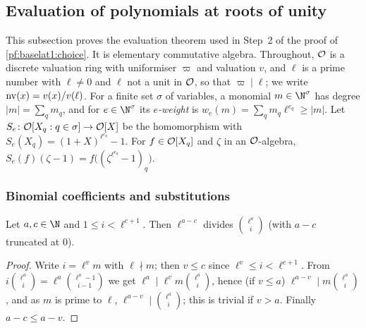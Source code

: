 \subsection{Evaluation of polynomials at roots of unity}\label{pf:baselat1:ssec:roots}

This subsection proves the evaluation theorem used in Step~2 of the proof of \cref{pf:baselat1:choice}. It is
elementary commutative algebra. Throughout, $\mathcal O$ is a discrete valuation ring with uniformiser $\varpi$
and valuation $v$, and $\ell$ is a prime number with $\ell\ne0$ and $\ell$ not a unit in $\mathcal O$, so that
$\varpi\mid\ell$; we write $\operatorname{nv}(x)=v(x)/v(\ell)$. For a finite set $\sigma$ of variables, a monomial
$m\in\N^\sigma$ has degree $|m|=\sum_qm_q$, and for $e\in\N^\sigma$ its \emph{$e$-weight} is
$w_e(m)=\sum_qm_q\ell^{e_q}\ge|m|$. Let $S_e\colon\mathcal O[X_q:q\in\sigma]\to\mathcal O[X]$ be the
homomorphism with $S_e(X_q)=(1+X)^{\ell^{e_q}}-1$. For $f\in\mathcal O[X_q]$ and $\zeta$ in an
$\mathcal O$-algebra, $S_e(f)(\zeta-1)=f\bigl((\zeta^{\ell^{e_q}}-1)_q\bigr)$.

\subsubsection{Binomial coefficients and substitutions}

\begin{lemma}\label{pf:baselat1:binom}
Let $a,c\in\N$ and $1\le i<\ell^{c+1}$. Then $\ell^{a-c}$ divides $\binom{\ell^a}{i}$ (with $a-c$ truncated at $0$).
\end{lemma}

\begin{proof}
Write $i=\ell^{v}m$ with $\ell\nmid m$; then $v\le c$ since $\ell^v\le i<\ell^{c+1}$. From
$i\binom{\ell^a}{i}=\ell^a\binom{\ell^a-1}{i-1}$ we get $\ell^a\mid\ell^vm\binom{\ell^a}{i}$, hence (if $v\le a$)
$\ell^{a-v}\mid m\binom{\ell^a}{i}$, and as $m$ is prime to $\ell$, $\ell^{a-v}\mid\binom{\ell^a}{i}$; this is trivial
if $v>a$. Finally $a-c\le a-v$.
\end{proof}

